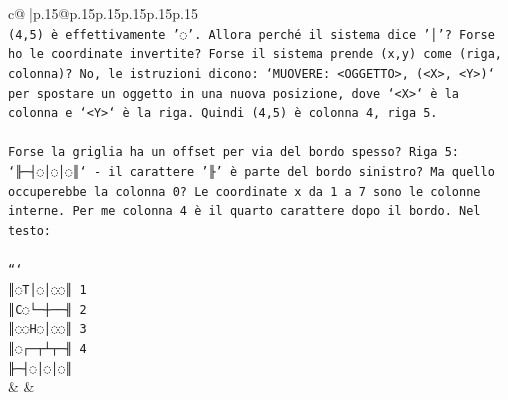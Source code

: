 \documentclass{article}
\begin{document}
{\begin{supertabular}{c@{$\;$}|p{.15\linewidth}@{}p{.15\linewidth}p{.15\linewidth}p{.15\linewidth}p{.15\linewidth}p{.15\linewidth}}
{{{\\ 
\texttt{(4,5) è effettivamente '◌'. Allora perché il sistema dice '│'? Forse ho le coordinate invertite? Forse il sistema prende (x,y) come (riga, colonna)? No, le istruzioni dicono: `MUOVERE: <OGGETTO>, (<X>, <Y>)` per spostare un oggetto in una nuova posizione, dove `<X>` è la colonna e `<Y>` è la riga. Quindi (4,5) è colonna 4, riga 5.} \\
\\ 
\texttt{Forse la griglia ha un offset per via del bordo spesso? Riga 5: `╟─┤◌│◌│◌║` {-} il carattere '╟' è parte del bordo sinistro? Ma quello occuperebbe la colonna 0? Le coordinate x da 1 a 7 sono le colonne interne. Per me colonna 4 è il quarto carattere dopo il bordo. Nel testo:} \\
\\ 
\texttt{```} \\
\texttt{║◌T│◌│◌◌║ 1} \\
\texttt{║C◌└─┼──╢ 2} \\
\texttt{║◌◌H◌│◌◌║ 3} \\
\texttt{║◌┌─┬┴┬─╢ 4} \\
\texttt{╟─┤◌│◌│◌║} \\
            }
        }
    }
    & & \\ \\


\end{supertabular}}
\end{document}
